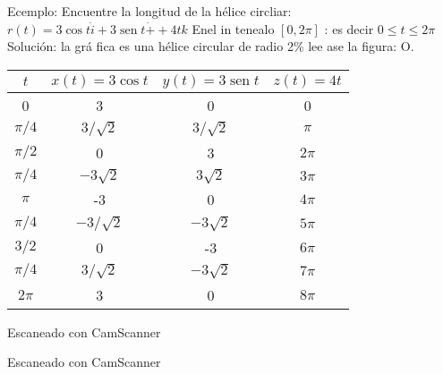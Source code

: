 Ecemplo: Encuentre la longitud de la hélice circliar: $r(t)=3 \cos t \dot{i}+3 \operatorname{sen} t \dot{+}+4 t k$ Enel in tenealo $[0,2 \pi]$ : es decir $0 \leqslant t \leqslant 2 \pi$ Solución: la grá fica es una hélice circular de radio 2\% lee ase la figura:
O.
\begin{tabular}{|c|c|c|c|}
	\hline$t$ & $x(t)=3 \cos t$ & $y(t)=3 \operatorname{sen} t$ & $z(t)=4 t$ \\
	\hline 0 & 3 & 0 & 0 \\
	\hline$\pi / 4$ & $3 / \sqrt{2}$ & $3 / \sqrt{2}$ & $\pi$ \\
	\hline$\pi / 2$ & 0 & 3 & $2 \pi$ \\
	\hline$\pi / 4$ & $-3 \sqrt{2}$ & $3 \sqrt{2}$ & $3 \pi$ \\
	\hline$\pi$ & -3 & 0 & $4 \pi$ \\
	\hline$\pi / 4$ & $-3 / \sqrt{2}$ & $-3 \sqrt{2}$ & $5 \pi$ \\
	\hline $3 / 2$ & 0 & -3 & $6 \pi$ \\
	\hline$\pi / 4$ & $3 / \sqrt{2}$ & $-3 \sqrt{2}$ & $7 \pi$ \\
	\hline $2 \pi$ & 3 & 0 & $8 \pi$ \\
	\hline
\end{tabular}
Escaneado con CamScanner




Escaneado con CamScanner





 
